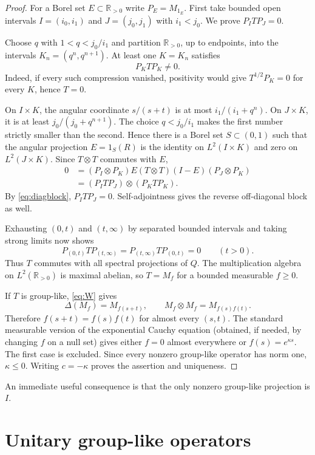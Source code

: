 \documentclass[11pt]{article}
\newcommand{\R}{\mathbb R}
\begin{document}
\begin{proof}
For a Borel set $E\subset\R_{>0}$ write $P_E=M_{1_E}$.  First take bounded
open intervals $I=(i_0,i_1)$ and $J=(j_0,j_1)$ with $i_1<j_0$.  We prove
$P_ITP_J=0$.

Choose $q$ with $1<q<j_0/i_1$ and partition $\R_{>0}$, up to endpoints, into
the intervals $K_n=(q^n,q^{n+1})$.  At least one $K=K_n$ satisfies
\begin{equation}\label{eq:diagblock}
 P_KTP_K\neq0.
\end{equation}
Indeed, if every such compression vanished, positivity would give
$T^{1/2}P_K=0$ for every $K$, hence $T=0$.

On $I\times K$, the angular coordinate $s/(s+t)$ is at most
$i_1/(i_1+q^n)$.  On $J\times K$, it is at least
$j_0/(j_0+q^{n+1})$.  The choice $q<j_0/i_1$ makes the first number strictly
smaller than the second.  Hence there is a Borel set $S\subset(0,1)$ such
that the angular projection $E=1_S(R)$ is the identity on
$L^2(I\times K)$ and zero on $L^2(J\times K)$.  Since $T\otimes T$ commutes
with $E$,
\begin{align*}
 0
 &=(P_I\otimes P_K)E(T\otimes T)(I-E)(P_J\otimes P_K)\\
 &=(P_ITP_J)\otimes(P_KTP_K).
\end{align*}
By \eqref{eq:diagblock}, $P_ITP_J=0$.  Self-adjointness gives the reverse
off-diagonal block as well.

Exhausting $(0,t)$ and $(t,\infty)$ by separated bounded intervals and taking
strong limits now shows
\[
 P_{(0,t)}TP_{(t,\infty)}=P_{(t,\infty)}TP_{(0,t)}=0
 \qquad(t>0).
\]
Thus $T$ commutes with all spectral projections of $Q$.  The multiplication
algebra on $L^2(\R_{>0})$ is maximal abelian, so $T=M_f$ for a bounded
measurable $f\geq0$.

If $T$ is group-like, \eqref{eq:W} gives
\[
 \Delta(M_f)=M_{f(s+t)},\qquad
 M_f\otimes M_f=M_{f(s)f(t)}.
\]
Therefore $f(s+t)=f(s)f(t)$ for almost every $(s,t)$.  The standard
measurable version of the exponential Cauchy equation (obtained, if needed,
by changing $f$ on a null set) gives either $f=0$ almost everywhere or
$f(s)=e^{\kappa s}$.  The first case is excluded.  Since every nonzero
group-like operator has norm one, $\kappa\leq0$.  Writing $c=-\kappa$ proves
the assertion and uniqueness.
\end{proof}

An immediate useful consequence is that the only nonzero group-like
projection is $I$.

\section{Unitary group-like operators}
\end{document}
